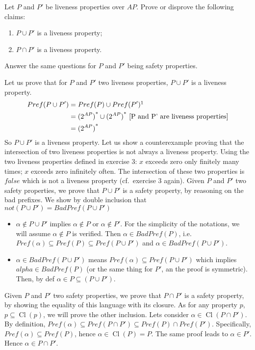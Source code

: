 \documentclass[11pt,a4paper]{article}
\DeclareMathOperator{\Cl}{Cl}
\begin{document}
\begin{Exercise}
Let $P$ and $P'$ be liveness properties over $AP$. Prove or disprove the following claims:
\begin{enumerate}
\item $P \cup P'$ is a liveness property;
\item $P \cap P'$ is a liveness property.
\end{enumerate}
Answer the same questions for $P$ and $P'$ being safety properties.
\end{Exercise}

\begin{Answer}
\Question%
Let us prove that for $P$ and $P'$ two liveness properties, $P \cup P'$ is a liveness property.
\begin{align*}Pref(P \cup P') &= Pref(P) \cup Pref(P')\footnotemark[1]\\
                              &= {(2^{AP})}^* \cup {(2^{AP})}^* \text{ [P and P' are liveness properties]}\\
                              &= {(2^{AP})}^*
\end{align*}
So $P \cup P'$ is a liveness property.
\Question%
Let us show a counterexample proving that the intersection of two liveness properties is not always a liveness property.
Using the two liveness properties defined in exercise 3: $x$ exceeds zero only finitely many times; $x$ exceeds zero infinitely often.
The intersection of these two properties is $false$ which is not a liveness property (cf.\ exercise 3 again).
\Question%
Given $P$ and $P'$ two safety properties, we prove that $P\cup P'$ is a safety property, by reasoning on the bad prefixes. We show by double inclusion that $ not( P\cup P') = BadPref( P\cup P')$ %
\begin{itemize}
\item $\alpha \notin P\cup P'$ implies $\alpha \notin P$ or $\alpha \notin P'$.
For the simplicity of the notations, we will assume $\alpha \notin P$ is verified. Then $\alpha \in BadPref(P)$, i.e. $Pref(\alpha) \subseteq Pref(P) \subseteq Pref(P \cup P')$ and $\alpha \in BadPref(P \cup P')$.
\item $\alpha \in BadPref(P\cup P')$ means $Pref(\alpha) \subseteq Pref(P \cup P')$ which implies $alpha \in BadPref(P)$ (or the same thing for $P'$, an the proof is symmetric). Then, by def $\alpha \in P \subseteq (P \cup P')$.
\end{itemize}
\Question%
Given $P$ and $P'$ two safety properties, we prove that $P\cap P'$ is a safety property, by showing the equality of this language with its closure.
As for any property $p$, $p \subseteq \Cl(p)$, we will prove the other inclusion. Lets consider $\alpha \in \Cl(P\cap P')$. By definition, $Pref(\alpha) \subseteq Pref(P\cap P') \subseteq Pref(P) \cap Pref(P')$\footnotemark[2].
Specifically, $Pref(\alpha) \subseteq Pref(P)$, hence $\alpha \in \Cl(P) = P$. The same proof leads to $\alpha \in P'$. Hence $\alpha \in P\cap P'$.



\end{Answer}
\end{document}
